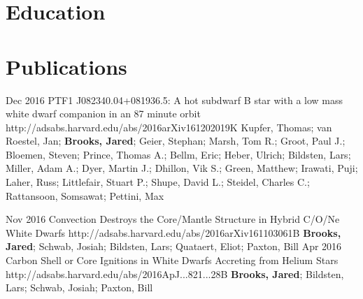 \documentclass[10pt]{article} %
\begin{document}
\section{Education}








\section{Publications}

\jobb
{Dec 2016}
{PTF1 J082340.04+081936.5: A hot subdwarf B star with a low mass white dwarf companion in an 87 minute orbit}
{http://adsabs.harvard.edu/abs/2016arXiv161202019K}
{Kupfer, Thomas; van Roestel, Jan; \textbf{Brooks, Jared}; Geier, Stephan; Marsh, Tom R.; Groot, Paul J.; Bloemen, Steven; Prince, Thomas A.; Bellm, Eric; Heber, Ulrich; Bildsten, Lars; Miller, Adam A.; Dyer, Martin J.; Dhillon, Vik S.; Green, Matthew; Irawati, Puji; Laher, Russ; Littlefair, Stuart P.; Shupe, David L.; Steidel, Charles C.; Rattansoon, Somsawat; Pettini, Max}


\joba
{Nov 2016}
{Convection Destroys the Core/Mantle Structure in Hybrid C/O/Ne White Dwarfs}
{http://adsabs.harvard.edu/abs/2016arXiv161103061B}
{\textbf{Brooks, Jared}; Schwab, Josiah; Bildsten, Lars; Quataert, Eliot; Paxton, Bill}
\joba
{Apr 2016}
{Carbon Shell or Core Ignitions in White Dwarfs Accreting from Helium Stars}
{http://adsabs.harvard.edu/abs/2016ApJ...821...28B}
{\textbf{Brooks, Jared}; Bildsten, Lars; Schwab, Josiah; Paxton, Bill}
\end{document}
